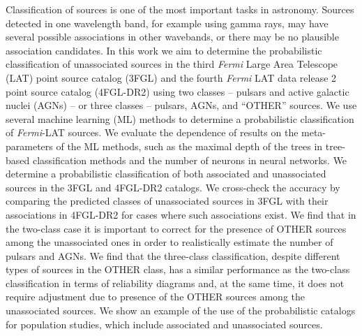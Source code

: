 \documentclass[referee]{aa} %
\newcommand{\Fermi}{\textit{Fermi}\xspace}
\begin{document}
\abstract
{
Classification of sources is one of the most important tasks in astronomy.
Sources detected in one wavelength band, for example using gamma rays, may have several possible associations in other wavebands, or
there may be no plausible association candidates.
}
{
In this work we aim to determine the probabilistic classification of unassociated sources in the third \Fermi Large Area Telescope (LAT) point source catalog (3FGL) and the fourth \Fermi LAT data release 2 point source catalog (4FGL-DR2) using two classes  -- pulsars and active galactic nuclei (AGNs) -- or three classes -- pulsars, AGNs, and ``OTHER'' sources.
}
{
We use several machine learning (ML) methods to determine a probabilistic classification of \Fermi-LAT sources.
We evaluate the dependence of results on the meta-parameters of the ML methods, such as the maximal depth of the trees in tree-based classification methods and the number of neurons in neural networks.
}
{
We determine a probabilistic classification of both associated and unassociated sources in the 3FGL and 4FGL-DR2 catalogs.
We cross-check the accuracy by comparing the predicted classes of unassociated sources in 3FGL with their associations in 4FGL-DR2 for cases where such associations exist.
We find that in the two-class %
case it is important to correct for the presence of OTHER sources among the unassociated ones in order to realistically estimate the number of pulsars and AGNs.
We find that the three-class classification, despite different types of sources in the OTHER class, has a similar performance as the two-class classification in terms of reliability diagrams and, at the same time, it does not require adjustment due to presence of the OTHER sources among the unassociated sources.
We show an example of the use of the probabilistic catalogs for population studies, which include associated and 
unassociated sources.
}
{}
\end{document}
